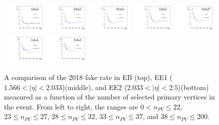 \begin{figure}[!htbp]
\caption{A comparison of the 2018 fake rate in EB (top), EE1 ($1.566 \mathopen< |\eta| \mathclose< 2.033$)(middle), and EE2 ($2.033 \mathopen< \lvert \eta \rvert \mathclose< 2.5$)(bottom) measured as a function of the number of selected primary vertices in the event. From left to right, the ranges are $0 \mathopen< n_{PV} \mathclose\leq 22$, $23 \mathopen\leq n_{PV} \mathclose\leq 27$, $28 \mathopen\leq n_{PV} \mathclose\leq 32$, $33 \mathopen\leq n_{PV} \leq 37$, and $38 \mathopen\leq n_{PV} \mathclose\leq 200$.}

\centering
\includegraphics[width=0.19\textwidth]{fig/compare_pv_EB_2018_0to22.pdf}
\includegraphics[width=0.19\textwidth]{fig/compare_pv_EB_2018_23to27.pdf}
\includegraphics[width=0.19\textwidth]{fig/compare_pv_EB_2018_28to32.pdf}
\includegraphics[width=0.19\textwidth]{fig/compare_pv_EB_2018_33to37.pdf}
\includegraphics[width=0.19\textwidth]{fig/compare_pv_EB_2018_38to200.pdf}\\
\includegraphics[width=0.19\textwidth]{fig/compare_pv_EE1_2018_0to22.pdf}
\includegraphics[width=0.19\textwidth]{fig/compare_pv_EE1_2018_23to27.pdf}

\end{figure}
